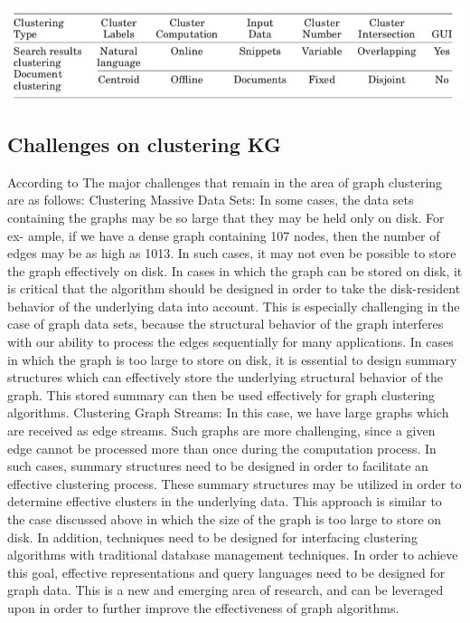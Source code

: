 \documentclass[runningheads]{llncs}
\begin{document}
\begin{center}
\includegraphics[width=1\textwidth]{traditional_vs_web.png}
\end{center}


\subsection{Challenges on clustering KG}
According to \cite{Aggarwal} The major challenges that remain in the area of graph clustering are as follows:
Clustering Massive Data Sets: In some cases, the data sets containing the graphs may be so large that they may be held only on disk. For ex- ample, if we have a dense graph containing 107 nodes, then the number of edges may be as high as 1013. In such cases, it may not even be possible to store the graph effectively on disk. In cases in which the graph can be stored on disk, it is critical that the algorithm should be designed in order to take the disk-resident behavior of the underlying data into account. This is especially challenging in the case of graph data sets, because the structural behavior of the graph interferes with our ability to process the edges sequentially for many applications. In cases in which the graph is too large to store on disk, it is essential to design summary structures which can effectively store the underlying structural behavior of the graph. This stored summary can then be used effectively for graph clustering algorithms.
Clustering Graph Streams: In this case, we have large graphs which are received as edge streams. Such graphs are more challenging, since a given edge cannot be processed more than once during the computation process. In such cases, summary structures need to be designed in order to facilitate an effective clustering process. These summary structures may be utilized in order to determine effective clusters in the underlying data. This approach is similar to the case discussed above in which the size of the graph is too large to store on disk.
In addition, techniques need to be designed for interfacing clustering algorithms with traditional database management techniques. In order to achieve this goal, effective representations and query languages need to be designed for graph data. This is a new and emerging area of research, and can be leveraged upon in order to further improve the effectiveness of graph algorithms.
\end{document}
